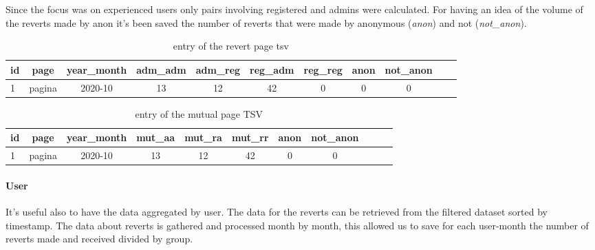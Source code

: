 Since the focus was on experienced users only pairs involving registered and admins were calculated.
For having an idea of the volume of the reverts made by anon it's been saved the number of reverts
that were made by anonymous (\textit{anon}) and not (\textit{not\_anon}).
\begin{table}[H]
    \centering
    \begin{tabularx}{\columnwidth}{@{}Xcccccccccc@{}}
        \midrule
        \textbf{id} & \textbf{page} & \textbf{year\_month} & \textbf{adm\_adm} & \textbf{adm\_reg} & \textbf{reg\_adm} & \textbf{reg\_reg} & \textbf{anon} & \textbf{not\_anon}\\ \toprule
        1 & pagina & 2020-10 & 13 & 12 & 42 & 0 & 0 & 0 \\
        
         \bottomrule
    \end{tabularx}
    
    \caption{entry of the revert page tsv \label{table:revertpage}}
\end{table}

\begin{table}[H]
    \centering
    \begin{tabularx}{\columnwidth}{@{}Xcccccccccc@{}}
        \midrule
        \textbf{id} & \textbf{page} & \textbf{year\_month} & \textbf{mut\_aa} & \textbf{mut\_ra}  & \textbf{mut\_rr} & \textbf{anon} & \textbf{not\_anon}\\ \toprule
        1 & pagina & 2020-10 & 13 & 12 & 42  & 0 & 0 \\
         \bottomrule
    \end{tabularx}
    
    \caption{entry of the mutual page TSV \label{table:mutualpage}}
\end{table}

\paragraph*{User}
It's useful also to have the data aggregated by user. The data for the reverts can be retrieved from
the filtered dataset sorted by timestamp. The data about reverts is gathered and processed month by
month, this allowed us to save for each user-month the number of reverts made and received divided by group.



